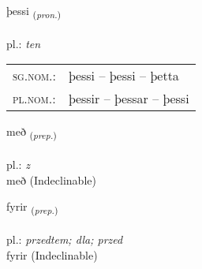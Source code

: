 \documentclass[frontgrid, backgrid]{flacards}\usepackage[]{graphicx}\usepackage[]{xcolor}
\begin{document}
{þessi \small{\textsubscript{(\textit{pron.})}} \\[1ex] %
\textphonetic{[θɛsɪ]} \\
pl.: \emph{ten} \\  [2ex]
\renewcommand*{\arraystretch}{0.8}
\begin{tabular}{ll}
\textsc{sg.nom.}: & þessi  --  þessi -- þetta \\ 
\textsc{pl.nom.}: & þessir -- þessar -- þessi
\end{tabular}
}


\renewcommand{\flhead}{\vskip5pt \fboxsep=0pt {\small\bfseries\footnotesize Forsetning | przyimek}}
\renewcommand{\fcfoot}{\vskip5pt \fboxsep=0pt \hspace{2pt}{\small\bfseries\footnotesize 1K}}

\renewcommand{\blhead}{\vskip5pt {\small\bfseries\footnotesize Forsetning | przyimek }}
\renewcommand{\bcfoot}{\vskip5pt \hspace{2pt}{\small\bfseries\footnotesize 1K}}


{með \small{\textsubscript{(\textit{prep.})}} \\[1ex]
\textphonetic{[mɛːð]} \\
pl.: \emph{z} \\  [2ex]
með (Indeclinable)}


\renewcommand{\flhead}{\vskip5pt \fboxsep=0pt {\small\bfseries\footnotesize Forsetning | przyimek}}
\renewcommand{\fcfoot}{\vskip5pt \fboxsep=0pt \hspace{2pt}{\small\bfseries\footnotesize 1K}}

\renewcommand{\blhead}{\vskip5pt {\small\bfseries\footnotesize Forsetning | przyimek }}
\renewcommand{\bcfoot}{\vskip5pt \hspace{2pt}{\small\bfseries\footnotesize 1K}}


{fyrir \small{\textsubscript{(\textit{prep.})}} \\[1ex]
\textphonetic{[fɪːrɪr]} \\
pl.: \emph{przedtem; dla; przed} \\  [2ex]
fyrir (Indeclinable)}
\end{document}
